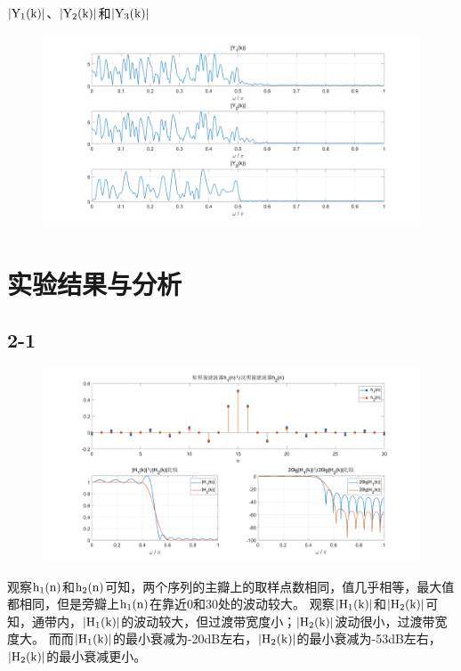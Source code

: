 \documentclass{../source/Experiment}
\begin{document}
        $\rm |Y_1(k)|$、$\rm |Y_2(k)|$和$\rm |Y_3(k)|$
        \begin{figure}[H]
            \centering
            \includegraphics[width = 1\textwidth]{src/exp4-5-2-3.png}
        \end{figure}
    \section{实验结果与分析}
        \subsection{2-1}
            \begin{figure}[H]
                \centering
                \includegraphics[width = 1\textwidth]{src/exp4-2-1.png}
            \end{figure}
            观察$\rm h_1(n)$和$\rm h_2(n)$可知，两个序列的主瓣上的取样点数相同，值几乎相等，最大值都相同，但是旁瓣上$\rm h_1(n)$在靠近0和30处的波动较大。
            观察$\rm |H_1(k)|$和$\rm |H_2(k)|$可知，通带内，$\rm |H_1(k)|$的波动较大，但过渡带宽度小；$\rm |H_2(k)|$波动很小，过渡带宽度大。
            而而$\rm |H_1(k)|$的最小衰减为-20dB左右，$\rm |H_2(k)|$的最小衰减为-53dB左右，$\rm |H_2(k)|$的最小衰减更小。
\end{document}
